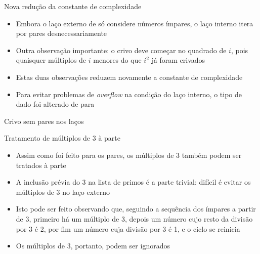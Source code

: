 \begin{frame}[fragile]{Nova redução da constante de complexidade}

    \begin{itemize}
        \item Embora o laço externo de  só considere números ímpares, o laço 
            interno itera por pares desnecessariamente

        \item Outra observação importante: o crivo deve começar no quadrado de $i$, pois quaisquer
            múltiplos de $i$ menores do que $i^2$ já foram crivados

        \item Estas duas observações reduzem novamente a constante de complexidade 

        \item Para evitar problemas de \textit{overflow} na condição do laço interno, o tipo de
            dado foi alterado de  para 
    \end{itemize}

\end{frame}

\begin{frame}[fragile]{Crivo sem pares nos laços}
\end{frame}

\begin{frame}[fragile]{Tratamento de múltiplos de 3 à parte}

    \begin{itemize}
        \item Assim como foi feito para os pares, os múltiplos de 3 também podem ser tratados à 
            parte

        \item A inclusão prévia do 3 na lista de primos é a parte trivial: difícil é evitar os 
            múltiplos de 3 no laço externo

        \item Isto pode ser feito observando que, seguindo a sequência dos ímpares a partir de 3, 
            primeiro há um múltiplo de 3, depois um número cujo resto da divisão por 3 é 2, por
            fim um número cuja divisão por 3 é 1, e o ciclo se reinicia

        \item Os múltiplos de 3, portanto, podem ser ignorados


    \end{itemize}

\end{frame}

